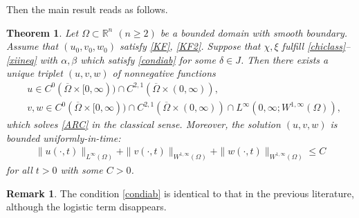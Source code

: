 \documentclass[12pt,reqno,draft]{article}
\numberwithin{equation}{section}
\theoremstyle{theorem}
\newtheorem{thm}{Theorem}[section]
\theoremstyle{definition}
\newtheorem{remark}{Remark}[section]
\newcommand{\Rn}{\mathbb{R}^n}
\newcommand{\cl}[1]{{\overline#1}}
\begin{document}
\vspace{6mm}
\noindent Then the main result reads as follows.

% 
\begin{thm} \label{mainthm}
 Let\/ $\Omega \subset \Rn$ $(n \ge 2)$ be a bounded domain 
 with smooth boundary. %
 Assume that $(u_0, v_0, w_0)$ satisfy \eqref{KF}, \eqref{KF2}. 
 Suppose that $\chi, \xi$ fulfill \eqref{chiclass}--\/\eqref{xiineq} 
 with $\alpha, \beta$ which satisfy \eqref{condiab} 
 for some $\delta \in J$. 
 Then there exists a unique triplet $(u, v, w)$ of nonnegative functions
% 
    \begin{align*}
        &u \in C^0(\cl{\Omega} \times [0,\infty)) 
                 \cap C^{2,1}(\cl{\Omega} \times (0,\infty)),
    \\
        &v, w \in C^0(\cl{\Omega} \times [0,\infty)) 
                 \cap C^{2,1}(\cl{\Omega} \times (0,\infty)) 
                 \cap L^\infty(0,\infty; W^{1,\infty}(\Omega)),
    \end{align*}
%  
 which solves \eqref{ARC} in the classical sense. 
 Moreover, the solution $(u, v, w)$ is bounded uniformly-in-time\/{\rm :}
% 
    \begin{align*}
           \|u(\cdot, t)\|_{L^\infty(\Omega)}
         +\|v(\cdot, t)\|_{W^{1,\infty}(\Omega)}
         +\|w(\cdot, t)\|_{W^{1,\infty}(\Omega)} 
    \le C
    \end{align*}
 for all $t>0$ with some $C>0$.
\end{thm}

\begin{remark}
The condition \eqref{condiab} is identical to that in the previous literature, 
although the logistic term 
disappears.
\end{remark}
\vspace{5mm}
\end{document}
